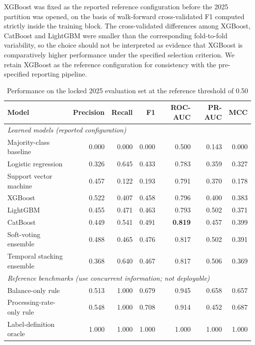 \documentclass[sn-vancouver,Numbered]{sn-jnl}
\begin{document}
XGBoost was fixed as the reported reference configuration before the 2025 partition was opened, on the basis of walk-forward cross-validated F1 computed strictly inside the training block. The cross-validated differences among XGBoost, CatBoost and LightGBM were smaller than the corresponding fold-to-fold variability, so the choice should not be interpreted as evidence that XGBoost is comparatively higher performance under the specified selection criterion. We retain XGBoost as the reference configuration for consistency with the pre-specified reporting pipeline.

\begin{table}[h]
\caption{Performance on the locked 2025 evaluation set at the reference threshold of 0.50}\label{tab:models}
\begin{tabular}{lrrrrrr}
\toprule
Model & Precision & Recall & F1 & ROC-AUC & PR-AUC & MCC \\
\midrule
\multicolumn{7}{l}{\emph{Learned models (reported configuration)}}\\
Majority-class baseline & 0.000 & 0.000 & 0.000 & 0.500 & 0.143 & 0.000 \\
Logistic regression & 0.326 & 0.645 & 0.433 & 0.783 & 0.359 & 0.327 \\
Support vector machine & 0.457 & 0.122 & 0.193 & 0.791 & 0.370 & 0.178 \\
XGBoost & 0.522 & 0.407 & 0.458 & 0.796 & 0.400 & 0.383 \\
LightGBM & 0.455 & 0.471 & 0.463 & 0.793 & 0.502 & 0.371 \\
CatBoost & 0.449 & 0.541 & 0.491 & \textbf{0.819} & 0.457 & 0.399 \\
Soft-voting ensemble & 0.488 & 0.465 & 0.476 & 0.817 & 0.502 & 0.391 \\
Temporal stacking ensemble & 0.368 & 0.640 & 0.467 & 0.817 & 0.506 & 0.369 \\
\midrule
\multicolumn{7}{l}{\emph{Reference benchmarks (use concurrent information; not deployable)}}\\
Balance-only rule & 0.513 & 1.000 & 0.679 & 0.945 & 0.658 & 0.657 \\
Processing-rate-only rule & 0.548 & 1.000 & 0.708 & 0.914 & 0.452 & 0.687 \\
Label-definition oracle & 1.000 & 1.000 & 1.000 & 1.000 & 1.000 & 1.000 \\
\bottomrule
\end{tabular}
\end{table}
\end{document}
